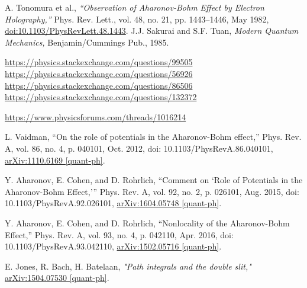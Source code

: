 \documentclass[a4paper,pdflatex,ja=standard]{bxjsarticle}
\begin{document}
\begin{thebibliography}{99}
    A. Tonomura et al., \textit{“Observation of Aharonov-Bohm Effect by Electron Holography,”} Phys. Rev. Lett., vol. 48, no. 21, pp. 1443–1446, May 1982, \href{https://link.aps.org/doi/10.1103/PhysRevLett.48.1443}{doi:10.1103/PhysRevLett.48.1443}.
    J.J. Sakurai and S.F. Tuan, \textit{Modern Quantum Mechanics,} Benjamin/Cummings Pub., 1985.

    \url{https://physics.stackexchange.com/questions/99505}
    \url{https://physics.stackexchange.com/questions/56926}
    \url{https://physics.stackexchange.com/questions/86506}
    \url{https://physics.stackexchange.com/questions/132372}

    \url{https://www.physicsforums.com/threads/1016214}

    L. Vaidman, “On the role of potentials in the Aharonov-Bohm effect,” Phys. Rev. A, vol. 86, no. 4, p. 040101, Oct. 2012, doi: 10.1103/PhysRevA.86.040101, \href{http://arxiv.org/abs/1110.6169}{arXiv:1110.6169 [quant-ph]}.
    
    Y. Aharonov, E. Cohen, and D. Rohrlich, “Comment on ‘Role of Potentials in the Aharonov-Bohm Effect,’” Phys. Rev. A, vol. 92, no. 2, p. 026101, Aug. 2015, doi: 10.1103/PhysRevA.92.026101, \href{http://arxiv.org/abs/1604.05748}{arXiv:1604.05748 [quant-ph]}.

    Y. Aharonov, E. Cohen, and D. Rohrlich, “Nonlocality of the Aharonov-Bohm Effect,” Phys. Rev. A, vol. 93, no. 4, p. 042110, Apr. 2016, doi: 10.1103/PhysRevA.93.042110, \href{http://arxiv.org/abs/1502.05716}{arXiv:1502.05716 [quant-ph]}.
    
    E. Jones, R. Bach, H. Batelaan, \textit{"Path integrals and the double slit,"} \href{https://doi.org/10.48550/arXiv.1504.07530}{arXiv:1504.07530 [quant-ph]}.
\end{thebibliography}
\end{document}
